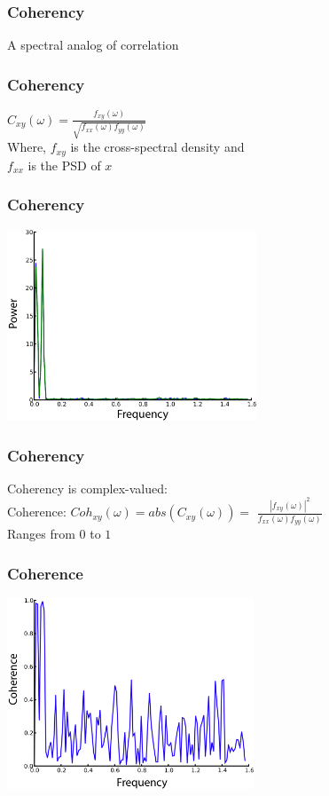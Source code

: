 \documentclass{beamer}
\begin{document}
\begin{frame}
\frametitle{Coherency}
A spectral analog of correlation
\end{frame}

\begin{frame}
\frametitle{Coherency}
$C_{xy}(\omega) = \frac{f_{xy}(\omega)}{\sqrt{f_{xx}(\omega)f_{yy}(\omega)}}$
\pause
\\
\vfill
Where, $f_{xy}$ is the cross-spectral density and 
\\
$f_{xx}$ is the PSD of $x$
\end{frame}

\begin{frame}
\frametitle{Coherency}
\includegraphics[height=5.7cm]{figures/outa_phase_tseries_psd}
\end{frame}

\begin{frame}
\frametitle{Coherency}
Coherency is complex-valued:
\\
\vfill
\pause
Coherence: $Coh_{xy} (\omega) = abs(C_{xy}(\omega)) = $
\pause
$\frac{|f_{xy}(\omega)|^2}{f_{xx}(\omega)f_{yy}(\omega)}$
\pause 
\\
\vfill
Ranges from $0$ to $1$
\end{frame}

\begin{frame}
\frametitle{Coherence}
\includegraphics[height=5.7cm]{figures/outa_phase_tseries_coh}
\end{frame}
\end{document}
